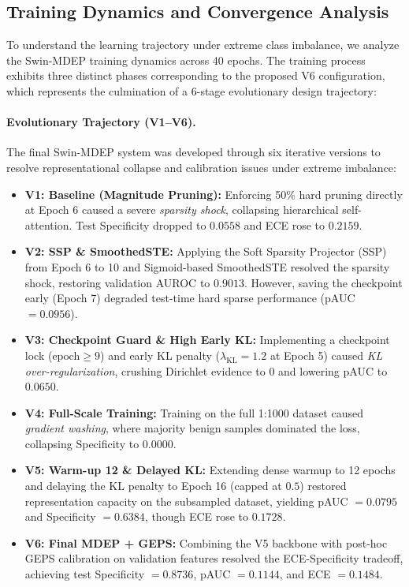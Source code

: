 \documentclass[letterpaper]{article} %
\begin{document}
\subsection{Training Dynamics and Convergence Analysis}\label{subsec:dynamics}
To understand the learning trajectory under extreme class imbalance, we analyze the Swin-MDEP training dynamics across 40 epochs. The training process exhibits three distinct phases corresponding to the proposed V6 configuration, which represents the culmination of a 6-stage evolutionary design trajectory:

\paragraph{Evolutionary Trajectory (V1--V6).}
The final Swin-MDEP system was developed through six iterative versions to resolve representational collapse and calibration issues under extreme imbalance:
\begin{itemize}
    \item \textbf{V1: Baseline (Magnitude Pruning):} Enforcing 50\% hard pruning directly at Epoch 6 caused a severe \emph{sparsity shock}, collapsing hierarchical self-attention. Test Specificity dropped to $0.0558$ and ECE rose to $0.2159$.
    \item \textbf{V2: SSP \& SmoothedSTE:} Applying the Soft Sparsity Projector (SSP) from Epoch 6 to 10 and Sigmoid-based SmoothedSTE resolved the sparsity shock, restoring validation AUROC to $0.9013$. However, saving the checkpoint early (Epoch 7) degraded test-time hard sparse performance (pAUC $= 0.0956$).
    \item \textbf{V3: Checkpoint Guard \& High Early KL:} Implementing a checkpoint lock ($\text{epoch} \ge 9$) and early KL penalty ($\lambda_{\text{KL}} = 1.2$ at Epoch 5) caused \emph{KL over-regularization}, crushing Dirichlet evidence to 0 and lowering pAUC to $0.0650$.
    \item \textbf{V4: Full-Scale Training:} Training on the full 1:1000 dataset caused \emph{gradient washing}, where majority benign samples dominated the loss, collapsing Specificity to $0.0000$.
    \item \textbf{V5: Warm-up 12 \& Delayed KL:} Extending dense warmup to 12 epochs and delaying the KL penalty to Epoch 16 (capped at $0.5$) restored representation capacity on the subsampled dataset, yielding pAUC $= 0.0795$ and Specificity $= 0.6384$, though ECE rose to $0.1728$.
    \item \textbf{V6: Final MDEP + GEPS:} Combining the V5 backbone with post-hoc GEPS calibration on validation features resolved the ECE-Specificity tradeoff, achieving test Specificity $= 0.8736$, pAUC $= 0.1144$, and ECE $= 0.1484$.
\end{itemize}
\end{document}
